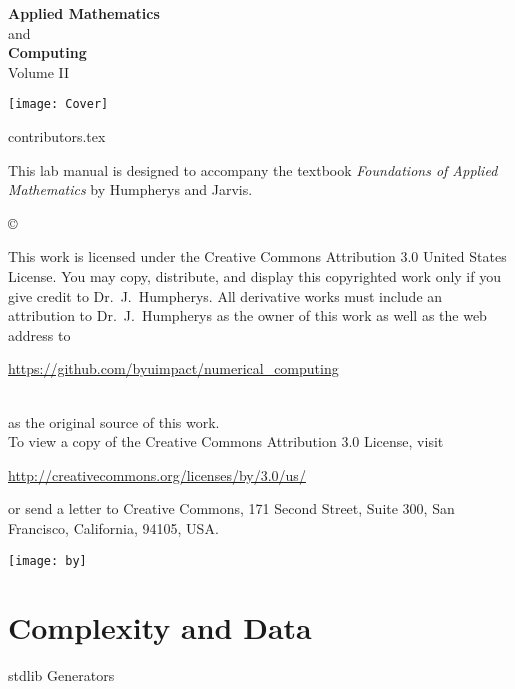 \documentclass[nociteref]{newsiambook}
\begin{document}
\thispagestyle{empty}
\begin{center}
{\huge \bf Applied Mathematics} \\ and \\ {\huge \bf Computing} \\
\vspace{5mm}
{\Large Volume II}
\vspace{20mm}

\texttt{[image: Cover]}
\end{center}
\frontmatter

{contributors.tex}


\begin{thepreface}
This lab manual is designed to accompany the textbook \emph{Foundations of Applied Mathematics} by Humpherys and Jarvis.

\vfill
\copyright{This work is licensed under the Creative Commons Attribution 3.0 United States
License.  You may copy, distribute, and display this copyrighted work only if you give
credit to Dr.~J.~Humpherys. All derivative works must include an attribution to Dr.~J.~Humpherys as the owner of this work as well as the web address to
\\\centerline{\url{https://github.com/byuimpact/numerical_computing}}\\ as the original source of
this
work.\\To view a copy of the Creative Commons Attribution 3.0 License,
visit\\\centerline{\url{http://creativecommons.org/licenses/by/3.0/us/}} or send a letter to
Creative Commons, 171 Second Street, Suite 300, San Francisco, California, 94105, USA.}

\vfill
\centering\texttt{[image: by]}
\vfill
\end{thepreface}

\setcounter{tocdepth}{1}
\tableofcontents

\mainmatter

\part{Complexity and Data}
{stdlib}
{Generators}
\end{document}
